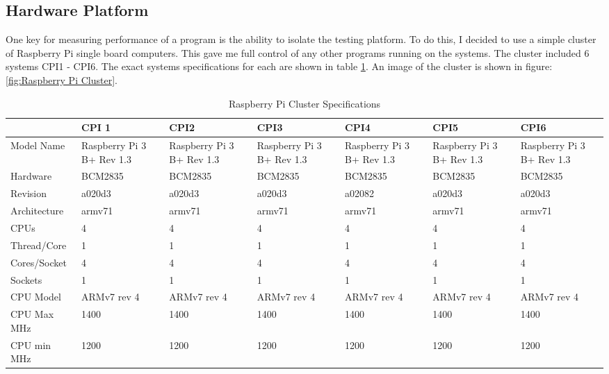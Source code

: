 \documentclass[11pt, a4paper]{article} %
\begin{document}
\subsection{Hardware Platform}
One key for measuring performance of a program is the ability to isolate the testing platform.  To do this, I decided to use a simple cluster of Raspberry Pi single board computers.  This gave me full control of any other programs running on the systems. The cluster included 6 systems CPI1 - CPI6. The exact systems specifications for each are shown in table \ref{table:clusterspec}. An image of the cluster is shown in figure:  \ref{fig:Raspberry Pi Cluster}.\\
\begin{table}
\begin{tabular}{ |p{2cm} | p{2cm} | p{2cm} | p{2cm} | p{2cm} | p{2cm} | p{2cm} |}
\hline
      & CPI 1&	CPI2 &	CPI3 & CPI4 & CPI5 & CPI6 \\
\hline
Model Name & Raspberry Pi 3 B+ Rev 1.3 & Raspberry Pi 3 B+ Rev 1.3 &Raspberry Pi 3 B+ Rev 1.3 &Raspberry Pi 3 B+ Rev 1.3 &Raspberry Pi 3 B+ Rev 1.3 &Raspberry Pi 3 B+ Rev 1.3 \\
\hline
Hardware & BCM2835 & BCM2835& BCM2835& BCM2835& BCM2835& BCM2835\\
\hline
Revision & a020d3& a020d3& a020d3& a02082& a020d3& a020d3\\
\hline
Architecture & armv71& armv71& armv71& armv71& armv71& armv71\\
\hline
CPUs & 4 & 4 & 4 & 4 & 4 & 4 \\
\hline
Thread/Core & 1& 1& 1& 1& 1& 1\\
\hline
Cores/Socket & 4& 4& 4& 4& 4& 4\\
\hline
Sockets & 1& 1& 1& 1& 1& 1\\
\hline
CPU Model & ARMv7 rev 4& ARMv7 rev 4& ARMv7 rev 4& ARMv7 rev 4& ARMv7 rev 4& ARMv7 rev 4\\
\hline
CPU Max MHz & 1400 & 1400 & 1400 & 1400 & 1400 & 1400 \\
\hline
CPU min MHz & 1200 & 1200 & 1200 & 1200 & 1200 & 1200 \\
\hline
\end{tabular}
\caption{Raspberry Pi Cluster Specifications}
\label{table:clusterspec}
\end{table}
\end{document}
